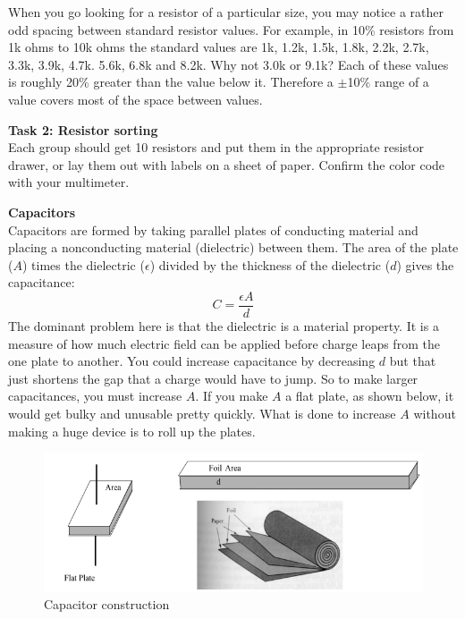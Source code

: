 \documentclass[12pt]{article}
\begin{document}
\begin{enumerate}[1.]
\par When you go looking for a resistor of a particular size, you may notice a rather odd spacing between standard resistor values. 
For example, in 10\% resistors from 1k ohms to 10k ohms the standard values are 1k, 1.2k, 1.5k, 1.8k, 2.2k, 2.7k, 3.3k, 3.9k, 4.7k. 5.6k, 6.8k and 8.2k. 
Why not 3.0k or 9.1k? 
Each of these values is roughly 20\% greater than the value below it. 
Therefore a $\pm$10\% range of a value covers most of the space between values.

{\bf Task 2: Resistor sorting}\\
Each group should get 10 resistors and put them in the appropriate resistor drawer, 
or lay them out with labels on a sheet of paper. 
Confirm the color code with your multimeter.

{\bf Capacitors}\\
Capacitors are formed by taking parallel plates of conducting material and placing a
nonconducting material (dielectric) between them. 
The area of the plate ($A$) times the
dielectric ($\epsilon$) divided by the thickness of the dielectric ($d$) gives the capacitance:
\begin{equation}
C = \frac{\epsilon A}{d} 
\end{equation}
The
dominant problem here is that the dielectric is a material property. It is a measure of
how much electric field can be applied before charge leaps from the one plate to another. 
You could increase capacitance by decreasing $d$ but that just shortens the gap that a charge would have to jump. 
So to make larger capacitances, you must increase $A$. 
If you make $A$ a flat plate, as shown below, it would get bulky and unusable pretty quickly. 
What is done to increase $A$ without making a huge device is to roll up the plates.

\begin{figure}[!ht]
\begin{center}
\includegraphics[width=\textwidth,trim=0 0 0 0,clip=false]{capconstruct.png}
\caption*{Capacitor construction}
\end{center}
\end{figure}


\end{enumerate}
\end{document}
